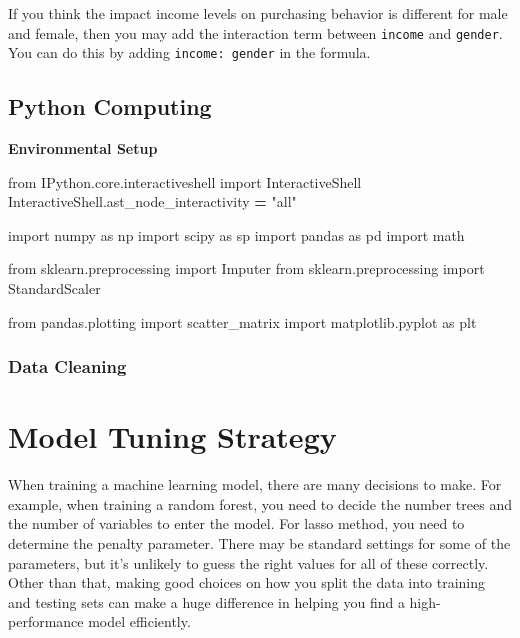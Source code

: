\documentclass[12pt,]{krantz}
\newenvironment{Shaded}{\begin{snugshade}}{\end{snugshade}}
\newcommand{\StringTok}[1]{\textcolor[rgb]{0.31,0.60,0.02}{{#1}}}
\newcommand{\ImportTok}[1]{{#1}}
\newcommand{\OperatorTok}[1]{\textcolor[rgb]{0.81,0.36,0.00}{\textbf{{#1}}}}
\newcommand{\NormalTok}[1]{{#1}}
\theoremstyle{definition}
\theoremstyle{definition}
\theoremstyle{remark}
\begin{document}
If you think the impact income levels on purchasing behavior is
different for male and female, then you may add the interaction term
between \texttt{income} and \texttt{gender}. You can do this by adding
\texttt{income:\ gender} in the formula.

\section{Python Computing}\label{python-computing}

\textbf{Environmental Setup}

\begin{Shaded}
\begin{Highlighting}[]
\ImportTok{from} \NormalTok{IPython.core.interactiveshell }\ImportTok{import} \NormalTok{InteractiveShell}
\NormalTok{InteractiveShell.ast_node_interactivity }\OperatorTok{=} \StringTok{"all"}

\ImportTok{import} \NormalTok{numpy }\ImportTok{as} \NormalTok{np}
\ImportTok{import} \NormalTok{scipy }\ImportTok{as} \NormalTok{sp}
\ImportTok{import} \NormalTok{pandas }\ImportTok{as} \NormalTok{pd}
\ImportTok{import} \NormalTok{math}

\ImportTok{from} \NormalTok{sklearn.preprocessing }\ImportTok{import} \NormalTok{Imputer}
\ImportTok{from} \NormalTok{sklearn.preprocessing }\ImportTok{import} \NormalTok{StandardScaler}

\ImportTok{from} \NormalTok{pandas.plotting }\ImportTok{import} \NormalTok{scatter_matrix}
\ImportTok{import} \NormalTok{matplotlib.pyplot }\ImportTok{as} \NormalTok{plt}
\end{Highlighting}
\end{Shaded}

\subsection{Data Cleaning}\label{data-cleaning-1}

\chapter{Model Tuning Strategy}\label{model-tuning-strategy}

When training a machine learning model, there are many decisions to
make. For example, when training a random forest, you need to decide the
number trees and the number of variables to enter the model. For lasso
method, you need to determine the penalty parameter. There may be
standard settings for some of the parameters, but it's unlikely to guess
the right values for all of these correctly. Other than that, making
good choices on how you split the data into training and testing sets
can make a huge difference in helping you find a high-performance model
efficiently.
\end{document}

